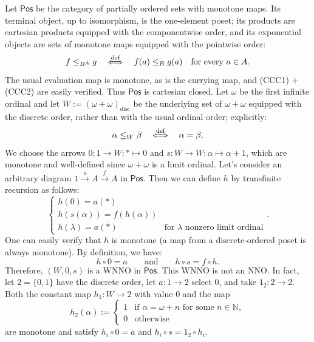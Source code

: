 \begin{example}
    Let $\textsf{Pos}$ be the category of partially ordered sets with monotone maps. Its terminal object, up to isomorphism, is the one-element poset; its products are cartesian products equipped with the componentwise order,
    and its exponential objects are sets of monotone maps equipped with the pointwise order:
    \[  f \leq_{B^A} g \quad\overset{\textnormal{def}}{\Longleftrightarrow}\quad f(a) \leq_B g(a) \quad\text{for every } a \in A. \]
    The usual evaluation map is monotone, as is the currying map, and (CCC1) + (CCC2) are easily verified. Thus $\textsf{Pos}$ is cartesian closed.
    Let $\omega$ be the first infinite ordinal and let $W := (\omega + \omega)_{\mathrm{disc}}$ be the underlying set of $\omega + \omega$ equipped with the discrete order, rather than with the usual ordinal order; explicitly:
    \[ \alpha \leq_W \beta \quad\overset{\textnormal{def}}{\Longleftrightarrow}\quad \alpha = \beta. \]
    We choose the arrows $0 : 1 \to W : * \mapsto 0$ and $s : W \to W : \alpha \mapsto \alpha + 1$, which are monotone and well-defined since $\omega + \omega$ is a limit ordinal.\newline
    Let's consider an arbitrary diagram $1 \xrightarrow{a} A \xrightarrow{f} A$ in $\textsf{Pos}$. Then we can define $h$ by transfinite recursion as follows:
    \[ \begin{cases}
        h(0) = a(*) \\
        h(s(\alpha)) = f(h(\alpha)) \\
        h(\lambda) = a(*) & \text{for $\lambda$ nonzero limit ordinal}
    \end{cases}. \]
    One can easily verify that $h$ is monotone (a map from a discrete-ordered poset is always monotone). By definition, we have:
    \[ h \circ 0 = a \qquad\text{and}\qquad h \circ s = f \circ h.
    \]
    Therefore, $(W,0,s)$ is a WNNO in $\textsf{Pos}$.\newline
    This WNNO is not an NNO. In fact, let $2 = \{0,1\}$ have the discrete order, let $a : 1 \to 2$ select $0$, and take $1_2 : 2 \to 2$. Both the constant map $h_1 : W \to 2$ with value $0$ and the map
    \[
        h_2(\alpha) :=
        \begin{cases}
            1 & \text{if } \alpha = \omega + n \text{ for some } n \in \mathbb{N}, \\
            0 & \text{otherwise}
        \end{cases}
    \]
    are monotone and satisfy $h_i \circ 0 = a$ and $h_i \circ s = 1_2 \circ h_i$.
\end{example}


